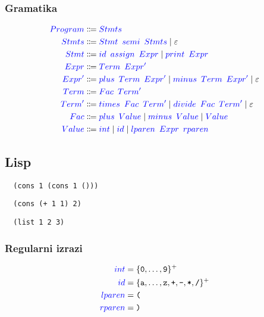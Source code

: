 \documentclass{article}
\newcommand{\Symbol}[1]{\textcolor{blue}{#1}}
\newcommand{\Null}{\varepsilon}
\newcommand{\Char}[1]{\texttt{#1}}
\newcommand{\Arrow}{\Coloneq}
\newcommand{\Seq}{{\ \,}}
\newcommand{\Union}{\mathrel{|}}
\newcommand{\KleenePlus}[1]{#1^+}
\begin{document}
\subsubsection*{Gramatika}
\begin{equation*}
  \begin{aligned}
    \Symbol{Program} &\Arrow \Symbol{Stmts}\\
    \Symbol{Stmts} &\Arrow \Symbol{Stmt} \Seq \Symbol{semi} \Seq \Symbol{Stmts} \Union \Null\\
    \Symbol{Stmt} &\Arrow \Symbol{id} \Seq \Symbol{assign} \Seq \Symbol{Expr} \Union \Symbol{print} \Seq \Symbol{Expr}\\
    \Symbol{Expr} &\Arrow \Symbol{Term} \Seq \Symbol{Expr'}\\
    \Symbol{Expr'} &\Arrow \Symbol{plus} \Seq \Symbol{Term} \Seq \Symbol{Expr'} \Union \Symbol{minus} \Seq \Symbol{Term} \Seq \Symbol{Expr'} \Union \Null\\
    \Symbol{Term} &\Arrow \Symbol{Fac} \Seq \Symbol{Term'}\\
    \Symbol{Term'} &\Arrow \Symbol{times} \Seq \Symbol{Fac} \Seq \Symbol{Term'} \Union \Symbol{divide} \Seq \Symbol{Fac} \Seq \Symbol{Term'} \Union \Null\\
    \Symbol{Fac} &\Arrow \Symbol{plus} \Seq \Symbol{Value} \Union \Symbol{minus} \Seq \Symbol{Value} \Union \Symbol{Value}\\
    \Symbol{Value} &\Arrow \Symbol{int} \Union \Symbol{id} \Union \Symbol{lparen} \Seq \Symbol{Expr} \Seq \Symbol{rparen}
  \end{aligned}
\end{equation*}

\subsection{Lisp}
\begin{verbatim}
  (cons 1 (cons 1 ()))
\end{verbatim}
\begin{verbatim}
  (cons (+ 1 1) 2)
\end{verbatim}
\begin{verbatim}
  (list 1 2 3)
\end{verbatim}

\subsubsection*{Regularni izrazi}
\begin{equation*}
  \begin{aligned}
    \Symbol{int} &= \KleenePlus{\{\Char{0}, \dots, \Char{9}\}}\\
    \Symbol{id} &= \KleenePlus{\{\Char{a}, \dots, \Char{z}, \Char{+}, \Char{-}, \Char{*}, \Char{/} \}}\\
    \Symbol{lparen} &= \Char{(}\\
    \Symbol{rparen} &= \Char{)}\\
  \end{aligned}
\end{equation*}
\end{document}
